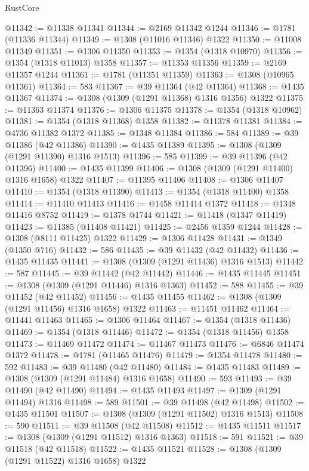 \begin{lexlean}{RustCore}
\begin{coremodule}
@11342 := @11338 @11341
@11344 := @2169 @11342 @1244
@11346 := @1781 (@11336 @11344)
@11349 := @1308 (@11016 @11346) @1322
@11350 := @11008 @11349
@11351 := @1306 @11350
@11353 := @1354 (@1318 @10970)
@11356 := @1354 (@1318 @11013) @1358
@11357 := @11353 @11356
@11359 := @2169 @11357 @1244
@11361 := @1781 (@11351 @11359)
@11363 := @1308 (@10965 @11361)
@11364 := 583
@11367 := @39 @11364 (@42 @11364)
@11368 := @1435 @11367
@11374 := @1308 (@1309 (@1291 @11368) @1316 @1356) @1322
@11375 := @11363 @11374
@11376 := @1306 @11375
@11378 := @1354 (@1318 @10962)
@11381 := @1354 (@1318 @11368) @1358
@11382 := @11378 @11381
@11384 := @4736 @11382 @1372
@11385 := @1348 @11384
@11386 := 584
@11389 := @39 @11386 (@42 @11386)
@11390 := @1435 @11389
@11395 := @1308 (@1309 (@1291 @11390) @1316 @1513)
@11396 := 585
@11399 := @39 @11396 (@42 @11396)
@11400 := @1435 @11399
@11406 := @1308 (@1309 (@1291 @11400) @1316 @1658) @1322
@11407 := @11395 @11406
@11408 := @1306 @11407
@11410 := @1354 (@1318 @11390)
@11413 := @1354 (@1318 @11400) @1358
@11414 := @11410 @11413
@11416 := @1458 @11414 @1372
@11418 := @1348 @11416 @8752
@11419 := @1378 @1744
@11421 := @11418 (@1347 @11419)
@11423 := @11385 (@11408 @11421)
@11425 := @2456 @1359 @1244
@11428 := @1308 (@8111 @11425) @1322
@11429 := @1306 @11428
@11431 := @1349 (@1350 @716)
@11432 := 586
@11435 := @39 @11432 (@42 @11432)
@11436 := @1435 @11435
@11441 := @1308 (@1309 (@1291 @11436) @1316 @1513)
@11442 := 587
@11445 := @39 @11442 (@42 @11442)
@11446 := @1435 @11445
@11451 := @1308 (@1309 (@1291 @11446) @1316 @1363)
@11452 := 588
@11455 := @39 @11452 (@42 @11452)
@11456 := @1435 @11455
@11462 := @1308 (@1309 (@1291 @11456) @1316 @1658) @1322
@11463 := @11451 @11462
@11464 := @11441 @11463
@11465 := @1306 @11464
@11467 := @1354 (@1318 @11436)
@11469 := @1354 (@1318 @11446)
@11472 := @1354 (@1318 @11456) @1358
@11473 := @11469 @11472
@11474 := @11467 @11473
@11476 := @6846 @11474 @1372
@11478 := @1781 (@11465 @11476)
@11479 := @1354 @11478
@11480 := 592
@11483 := @39 @11480 (@42 @11480)
@11484 := @1435 @11483
@11489 := @1308 (@1309 (@1291 @11484) @1316 @1658)
@11490 := 593
@11493 := @39 @11490 (@42 @11490)
@11494 := @1435 @11493
@11497 := @1309 (@1291 @11494) @1316
@11498 := 589
@11501 := @39 @11498 (@42 @11498)
@11502 := @1435 @11501
@11507 := @1308 (@1309 (@1291 @11502) @1316 @1513)
@11508 := 590
@11511 := @39 @11508 (@42 @11508)
@11512 := @1435 @11511
@11517 := @1308 (@1309 (@1291 @11512) @1316 @1363)
@11518 := 591
@11521 := @39 @11518 (@42 @11518)
@11522 := @1435 @11521
@11528 := @1308 (@1309 (@1291 @11522) @1316 @1658) @1322

\end{coremodule}
\end{lexlean}
